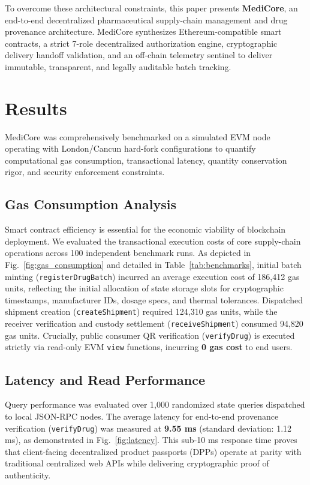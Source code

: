 \documentclass[pdflatex,sn-mathphys-num]{sn-jnl}
\theoremstyle{thmstyleone}
\theoremstyle{thmstyletwo}
\theoremstyle{thmstylethree}
\begin{document}
To overcome these architectural constraints, this paper presents \textbf{MediCore}, an end-to-end decentralized pharmaceutical supply-chain management and drug provenance architecture. MediCore synthesizes Ethereum-compatible smart contracts, a strict 7-role decentralized authorization engine, cryptographic delivery handoff validation, and an off-chain telemetry sentinel to deliver immutable, transparent, and legally auditable batch tracking.

\section{Results}\label{sec2}

MediCore was comprehensively benchmarked on a simulated EVM node operating with London/Cancun hard-fork configurations to quantify computational gas consumption, transactional latency, quantity conservation rigor, and security enforcement constraints.

\subsection{Gas Consumption Analysis}\label{sec2.1}
Smart contract efficiency is essential for the economic viability of blockchain deployment. We evaluated the transactional execution costs of core supply-chain operations across 100 independent benchmark runs. As depicted in Fig.~\ref{fig:gas_consumption} and detailed in Table~\ref{tab:benchmarks}, initial batch minting (\texttt{registerDrugBatch}) incurred an average execution cost of 186,412 gas units, reflecting the initial allocation of state storage slots for cryptographic timestamps, manufacturer IDs, dosage specs, and thermal tolerances. Dispatched shipment creation (\texttt{createShipment}) required 124,310 gas units, while the receiver verification and custody settlement (\texttt{receiveShipment}) consumed 94,820 gas units. Crucially, public consumer QR verification (\texttt{verifyDrug}) is executed strictly via read-only EVM \texttt{view} functions, incurring \textbf{0 gas cost} to end users.

\subsection{Latency and Read Performance}\label{sec2.2}
Query performance was evaluated over 1,000 randomized state queries dispatched to local JSON-RPC nodes. The average latency for end-to-end provenance verification (\texttt{verifyDrug}) was measured at \textbf{9.55 ms} (standard deviation: 1.12 ms), as demonstrated in Fig.~\ref{fig:latency}. This sub-10 ms response time proves that client-facing decentralized product passports (DPPs) operate at parity with traditional centralized web APIs while delivering cryptographic proof of authenticity.
\end{document}
